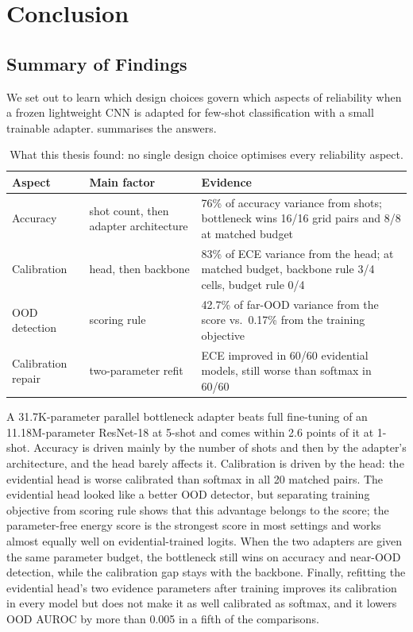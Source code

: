 \chapter{Conclusion}
\label{ch:conclusion}

\section{Summary of Findings}

We set out to learn which design choices govern which aspects of reliability when a frozen lightweight
CNN is adapted for few-shot classification with a small trainable adapter. 
summarises the answers.

\begin{table}[H]
\centering
\caption{What this thesis found: no single design choice optimises every reliability aspect.}
\label{tab:conclusion}
\begin{tabularx}{\textwidth}{@{}l>{\raggedright\arraybackslash}p{3.6cm}X@{}}
\toprule
Aspect & Main factor & Evidence \\
\midrule
Accuracy & shot count, then adapter architecture & 76\% of accuracy variance from shots; bottleneck wins 16/16 grid pairs and 8/8 at matched budget \\
Calibration & head, then backbone & 83\% of ECE variance from the head; at matched budget, backbone rule 3/4 cells, budget rule 0/4 \\
OOD detection & scoring rule & 42.7\% of far-OOD variance from the score vs.\ 0.17\% from the training objective \\
Calibration repair & two-parameter refit & ECE improved in 60/60 evidential models, still worse than softmax in 60/60 \\
\bottomrule
\end{tabularx}
\end{table}

A 31.7K-parameter parallel bottleneck adapter beats full fine-tuning of an 11.18M-parameter ResNet-18 at
5-shot and comes within 2.6 points of it at 1-shot. Accuracy is driven mainly by the number
of shots and then by the adapter's architecture, and the head barely affects it. Calibration is driven by
the head: the evidential head is worse calibrated than softmax in all 20 matched pairs. The evidential head
looked like a better OOD detector, but separating training objective from scoring rule shows that this
advantage belongs to the score; the parameter-free energy score is the strongest score in most settings and
works almost equally well on evidential-trained logits. When the two adapters are given the same parameter
budget, the bottleneck still wins on accuracy and near-OOD detection, while the calibration gap stays with
the backbone. Finally, refitting the evidential head's two evidence parameters after training improves its
calibration in every model but does not make it as well calibrated as softmax, and it lowers OOD AUROC by more
than 0.005 in a fifth of the comparisons.

